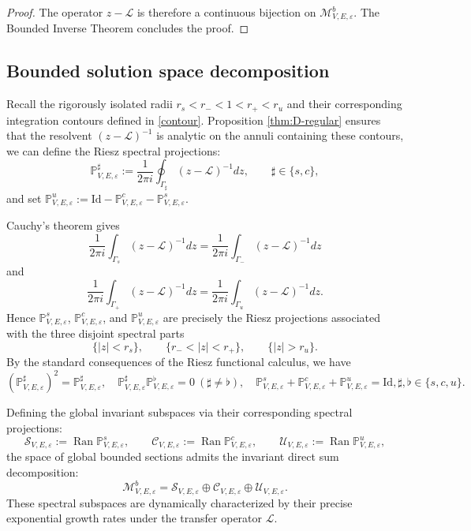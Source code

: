 \documentclass[reqno,11pt]{amsart}
\begin{document}
\begin{proof}
The operator $z-\mathcal{L}$ is therefore a continuous bijection on $\mathcal{M}_{V,E,\varepsilon}^b$. The Bounded Inverse Theorem concludes the proof.
\end{proof}



\subsection{Bounded solution space decomposition}

Recall the rigorously isolated radii $r_s < r_- < 1 < r_+ < r_u$ and their corresponding integration contours defined in \eqref{contour}. 
 Proposition \ref{thm:D-regular} ensures that the resolvent $(z-\mathcal{ L })^{-1}$ is analytic on the annuli containing these contours, we can define the Riesz spectral projections:
$$
\mathbb{P}^\sharp_{V,E,\varepsilon} := \frac{1}{2\pi i}\oint_{\Gamma_\sharp}(z-\mathcal{ L })^{-1} dz, \qquad \sharp\in\{s,c\},
$$
and set $\mathbb{P}^u_{V,E,\varepsilon} := \mathrm{Id} - \mathbb{P}^c_{V,E,\varepsilon} - \mathbb{P}^s_{V,E,\varepsilon}$.



 Cauchy's theorem gives
$$
\frac{1}{2\pi i}\int_{\Gamma_s}(z -\mathcal{ L })^{-1} dz=
\frac{1}{2\pi i}\int_{\Gamma_-}(z -\mathcal{ L })^{-1} dz
$$
and
$$
\frac{1}{2\pi i}\int_{\Gamma_+}(z -\mathcal{ L })^{-1} dz=
\frac{1}{2\pi i}\int_{\Gamma_u}(z -\mathcal{ L })^{-1} dz.
$$
Hence $\mathbb{P}^s_{V,E,\varepsilon}$, $\mathbb{P}^c_{V,E,\varepsilon}$, and
$\mathbb{P}^u_{V,E,\varepsilon}$ are precisely the Riesz projections associated with the three disjoint
spectral parts
$$
\{|z|<r_s\},
\qquad
\{r_-<|z|<r_+\},
\qquad
\{|z|>r_u\}.
$$
By the  standard consequences of the Riesz functional calculus, we have 
\begin{equation}\label{equ:riesz}
    (\mathbb{P}^\sharp_{V,E,\varepsilon})^2=\mathbb{P}^\sharp_{V,E,\varepsilon},
\quad
\mathbb{P}^\sharp_{V,E,\varepsilon}\mathbb{P}^\flat_{V,E,\varepsilon}=0\ (\sharp\neq \flat),
\quad
\mathbb{P}^s_{V,E,\varepsilon}+\mathbb{P}^c_{V,E,\varepsilon}+\mathbb{P}^u_{V,E,\varepsilon}=\mathrm{Id},\sharp,\flat\in\{s,c,u\}.
\end{equation}



Defining the global invariant subspaces via their corresponding spectral projections:
$$
\mathcal{S}_{V,E,\varepsilon} := \operatorname{Ran}\mathbb{P}^s_{V,E,\varepsilon}, \qquad
\mathcal{C}_{V,E,\varepsilon} := \operatorname{Ran}\mathbb{P}^c_{V,E,\varepsilon}, \qquad
\mathcal{U}_{V,E,\varepsilon} := \operatorname{Ran}\mathbb{P}^u_{V,E,\varepsilon},
$$
the space of global bounded sections admits the invariant direct sum decomposition:
$$
\mathcal{M}_{V,E,\varepsilon}^b
=\mathcal{S}_{V,E,\varepsilon}\oplus
\mathcal{C}_{V,E,\varepsilon}\oplus
\mathcal{U}_{V,E,\varepsilon}.
$$
These spectral subspaces are dynamically  characterized by their precise exponential growth rates under the transfer operator $\mathcal{L}$.
\end{document}
